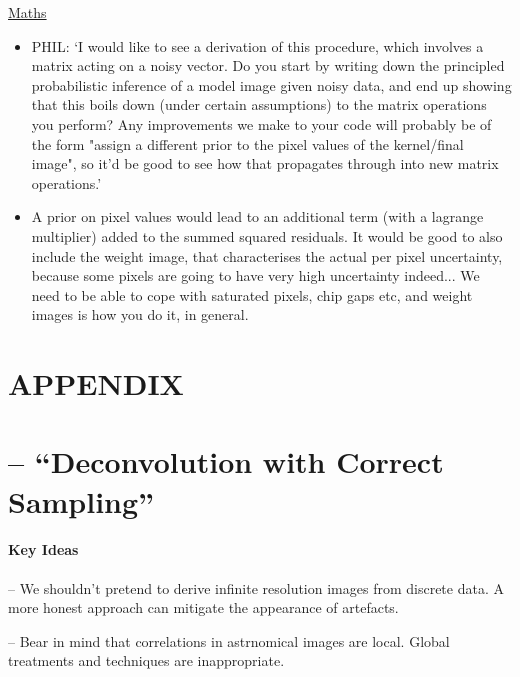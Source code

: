 \documentclass[letterpaper, 11pt]{article}
\begin{document}
\underline{Maths}
\begin{itemize}
	\item PHIL: `I would like to see a derivation of this procedure, which involves a
matrix acting on a noisy vector. Do you start by writing down the
principled probabilistic inference of a model image given noisy data,
and end up showing that this boils down (under certain assumptions) to
the matrix operations you perform? Any improvements we make to your
code will probably be of the form "assign a different prior to the
pixel values of the kernel/final image", so it'd be good to see how
that propagates through into new matrix operations.'

	\item A prior on pixel values would lead to an
additional term (with a lagrange multiplier) added to the summed
squared residuals. It would be good to also include the weight image, that
characterises the actual per pixel uncertainty, because some pixels
are going to have very high uncertainty indeed... We need to be able
to cope with saturated pixels, chip gaps etc, and weight images is how
you do it, in general.
\end{itemize}




\newpage
\appendix
{}
\section*{APPENDIX}

\section{\citet{MCS98} -- ``Deconvolution with Correct Sampling''}
\label{sec:MCS98notes}

\paragraph{Key Ideas}

-- We shouldn't pretend to derive infinite resolution images from discrete data. A more honest approach can mitigate the appearance of 
artefacts.

-- Bear in mind that correlations in astrnomical images are local. Global treatments and techniques are inappropriate.
\end{document}
